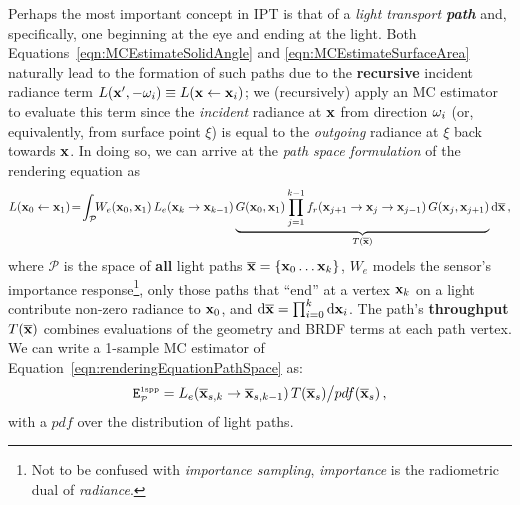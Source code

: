 %
\newline
%
Perhaps the most important concept in IPT is that of a \textit{light transport \textbf{path}} and, specifically, one beginning at the eye and ending at the light. Both Equations~\ref{eqn:MCEstimateSolidAngle} and \ref{eqn:MCEstimateSurfaceArea} naturally lead to the formation of such paths due to the \textbf{recursive} incident radiance term $L(\mathbf{x}', -\mathbf{\omega}_i) \equiv L(\mathbf{x} \leftarrow \mathbf{x}_i)$; we (recursively) apply an MC estimator to evaluate this term since the \textit{incident} radiance at $\mathbf{x}$ from direction $\mathbf{\omega}_i$ (or, equivalently, from surface point $\xi$) is equal to the \textit{outgoing} radiance at $\xi$ back towards $\mathbf{x}$. In doing so, we can arrive at the \textit{path space formulation} of the rendering equation as
%
\begin{align}
\label{eqn:renderingEquationPathSpace}
L(\mathbf{x}_0 \leftarrow \mathbf{x}_1) \!= \!\int_{\mathcal{P}} \!\! W_e(\mathbf{x}_0, \mathbf{x}_1) \, L_e(\mathbf{x}_k \rightarrow \mathbf{x}_{k-1}) \underbrace{G(\mathbf{x}_{0} , \mathbf{x}_{1}) \prod_{j=1}^{k-1} f_r(\mathbf{x}_{j+1} \rightarrow \mathbf{x}_{j} \rightarrow \mathbf{x}_{j-1}) \, G(\mathbf{x}_j , \mathbf{x}_{j+1})}_{T(\overline{\mathbf{x}})} \mbox{d}\overline{\mathbf{x}}\,,
\end{align}
%
where $\mathcal{P}$ is the space of \textbf{all} light paths $\overline{\mathbf{x}} = \{\mathbf{x}_0 \ldots \mathbf{x}_k\}$, $W_e$ models the sensor's importance response\footnote{Not to be confused with \textit{importance sampling}, \textit{importance} is the radiometric dual of \textit{radiance}.}, only those paths that ``end'' at a vertex $\mathbf{x}_k$ on a light contribute non-zero radiance to $\mathbf{x}_0$, and $\mbox{d}\overline{\mathbf{x}} = \prod_{i=0}^k \mbox{d}\mathbf{x}_i$. The path's \textbf{throughput} $T(\overline{\mathbf{x}})$ combines evaluations of the geometry and BRDF terms at each path vertex. We can write a 1-sample MC estimator of Equation~\ref{eqn:renderingEquationPathSpace} as: 
%
\begin{align}
\label{eqn:MCEstimatePathSpace}
\mathtt{E}^{\mbox{\tiny{1spp}}}_{\mbox{\tiny{$\mathcal{P}$}}} = L_e(\overline{\mathbf{x}}_{s,k} \rightarrow \overline{\mathbf{x}}_{s,k-1}) \, T(\overline{\mathbf{x}}_s) \big/ pdf(\overline{\mathbf{x}}_s)\,,
\end{align}
with a $pdf$ over the distribution of light paths.\\


